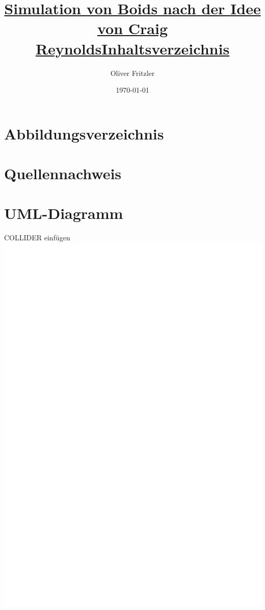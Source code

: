 \documentclass[a4paper, 12pt]{article}
\begin{document}
	\begin{titlepage}
		\title{\Large{\textbf{\underline{Simulation von Boids nach der Idee von Craig Reynolds}}}}
		\author{Oliver Fritzler}
		\date{\today}
		\maketitle
	\end{titlepage}
	\title{\Large{\textbf{\underline{Inhaltsverzeichnis}}}}
	\tableofcontents
	\newpage
	\section{Abbildungsverzeichnis}
	\newpage
	\section{Quellennachweis}
	\newpage
	\section{UML-Diagramm}
	COLLIDER einfügen
	\includegraphics[scale=0.75, page=2]{UML/Boids_UML.pdf}
	\newpage
\end{document}
